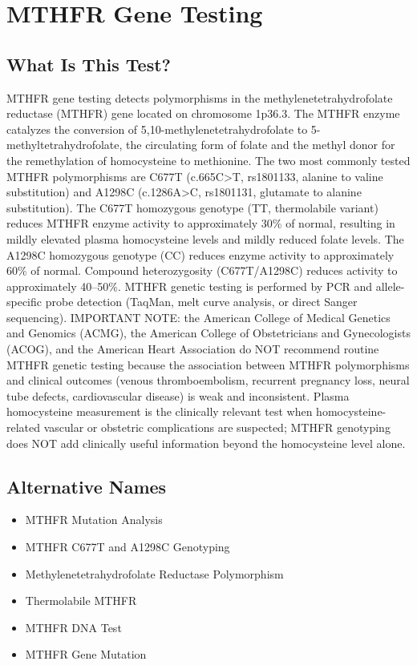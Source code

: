 \chapter{MTHFR Gene Testing}

\section*{What Is This Test?}
MTHFR gene testing detects polymorphisms in the methylenetetrahydrofolate reductase (MTHFR) gene located on chromosome 1p36.3. The MTHFR enzyme catalyzes the conversion of 5,10-methylenetetrahydrofolate to 5-methyltetrahydrofolate, the circulating form of folate and the methyl donor for the remethylation of homocysteine to methionine. The two most commonly tested MTHFR polymorphisms are C677T (c.665C>T, rs1801133, alanine to valine substitution) and A1298C (c.1286A>C, rs1801131, glutamate to alanine substitution). The C677T homozygous genotype (TT, thermolabile variant) reduces MTHFR enzyme activity to approximately 30\% of normal, resulting in mildly elevated plasma homocysteine levels and mildly reduced folate levels. The A1298C homozygous genotype (CC) reduces enzyme activity to approximately 60\% of normal. Compound heterozygosity (C677T/A1298C) reduces activity to approximately 40--50\%. MTHFR genetic testing is performed by PCR and allele-specific probe detection (TaqMan, melt curve analysis, or direct Sanger sequencing). IMPORTANT NOTE: the American College of Medical Genetics and Genomics (ACMG), the American College of Obstetricians and Gynecologists (ACOG), and the American Heart Association do NOT recommend routine MTHFR genetic testing because the association between MTHFR polymorphisms and clinical outcomes (venous thromboembolism, recurrent pregnancy loss, neural tube defects, cardiovascular disease) is weak and inconsistent. Plasma homocysteine measurement is the clinically relevant test when homocysteine-related vascular or obstetric complications are suspected; MTHFR genotyping does NOT add clinically useful information beyond the homocysteine level alone.

\section*{Alternative Names}
\begin{itemize}
  \item MTHFR Mutation Analysis
  \item MTHFR C677T and A1298C Genotyping
  \item Methylenetetrahydrofolate Reductase Polymorphism
  \item Thermolabile MTHFR
  \item MTHFR DNA Test
  \item MTHFR Gene Mutation
\end{itemize}
